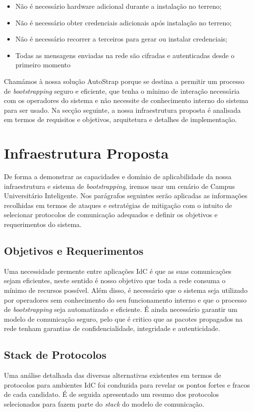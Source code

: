 \documentclass{llncs}
\begin{document}
\begin{itemize}
	\item{Não é necessário hardware adicional durante a instalação no terreno};
	\item{Não é necessário obter credenciais adicionais após instalação no terreno};
	\item{Não é necessário recorrer a terceiros para gerar ou instalar credenciais};
	\item{Todas as mensagens enviadas na rede são cifradas e autenticadas desde o primeiro momento}
\end{itemize}
	
Chamámos à nossa solução AutoStrap porque se destina a permitir um processo de \textit{bootstrapping} seguro e eficiente, que tenha o mínimo de interação necessária com os operadores do sistema e não necessite de conhecimento interno do sistema para ser usado. Na secção seguinte, a nossa infraestrutura proposta é analisada em termos de requisitos e objetivos, arquitetura e detalhes de implementação.

\section{Infraestrutura Proposta}
\label{sec:proposed_infrastructure}
De forma a demonstrar as capacidades e domínio de aplicabilidade da nossa infraestrutura e sistema de \textit{bootstrapping}, iremos usar um cenário de Campus Universitário Inteligente. Nos parágrafos seguintes serão aplicadas as informações recolhidas em termos de ataques e estratégias de mitigação com o intuito de selecionar protocolos de comunicação adequados e definir os objetivos e requerimentos do sistema.

\subsection{Objetivos e Requerimentos}
Uma necessidade premente entre aplicações \ac{IdC} é que as suas comunicações sejam eficientes, neste sentido é nosso objetivo que toda a rede consuma o mínimo de recursos possível. Além disso, é necessário que o sistema seja utilizado por operadores sem conhecimento do seu funcionamento interno e que o processo de \textit{bootstrapping} seja automatizado e eficiente. É ainda necessário garantir um modelo de comunicação seguro, pelo que é critico que as pacotes propagados na rede tenham garantias de confidencialidade, integridade e autenticidade.

\subsection{Stack de Protocolos}
\label{sec:protocol_stack}
Uma análise detalhada das diversas alternativas existentes em termos de protocolos para ambientes \ac{IdC} \cite{Al-Fuqaha2015} foi conduzida para revelar os pontos fortes e fracos de cada candidato. É de seguida apresentado um resumo dos protocolos selecionados para fazem parte do \textit{stack} do modelo de comunicação.
\end{document}
